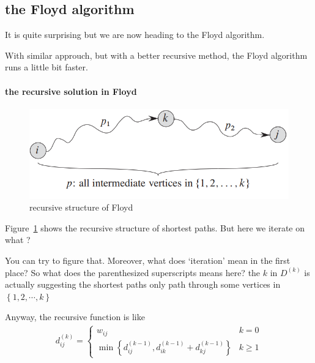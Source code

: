 \documentclass[a4paper, 10pt]{ctexart} %
\begin{document}
\subsection{the Floyd algorithm}
It is quite surprising but we are 
now heading 
to 
the Floyd 
algorithm.

With similar approuch, but with a better
recursive method, the Floyd algorithm 
runs a little bit faster.

\paragraph{the recursive solution in Floyd} %
\label{par:the recursive solution in Floyd}
\begin{figure}
    \centering
    \includegraphics[scale = 0.5]{apsp2.png}
    \caption{recursive structure of Floyd}
    \label{fig:apsp2}
\end{figure}

Figure~\ref{fig:apsp2} shows the recursive structure of 
shortest paths. But here we iterate on what ? 

You can try to figure that. Moreover, what does 
`iteration' mean in the first place? 
So what does the parenthesized superscripts means here?
the $k$ in $D^{\left(k\right)}$ is actually suggesting 
the shortest paths only 
path through some vertices in 
$\left\{ 1 , 2 , \cdots , k\right\}$

Anyway, the recursive function is like
\begin{align*}
d^{\left(k\right) } _{ij} = 
\begin{cases}
    w_{ij} & k= 0 \\
    \min_{}\left\{ d^{\left(  k-1\right) }_{ij}, 
    d^{\left(k -1\right)} _{ik} + d^{(k-1)}_{kj}\right\} & 
    k \ge 1
\end{cases}
\end{align*}
\end{document}
